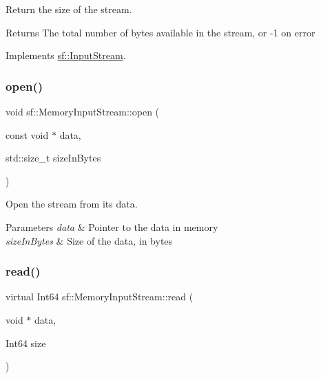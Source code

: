 Return the size of the stream. 

\begin{DoxyReturn}{Returns}
The total number of bytes available in the stream, or -\/1 on error 
\end{DoxyReturn}


Implements \hyperlink{classsf_1_1_input_stream_a311eaaaa65d636728e5153b574b72d5d}{sf\+::\+Input\+Stream}.

\mbox{\label{classsf_1_1_memory_input_stream_ad3cfb4f4f915f7803d6a0784e394ac19}} 
\subsubsection{\texorpdfstring{open()}{open()}}
{\footnotesize\ttfamily void sf\+::\+Memory\+Input\+Stream\+::open (\begin{DoxyParamCaption}\item[{const void $\ast$}]{data,  }\item[{std\+::size\+\_\+t}]{size\+In\+Bytes }\end{DoxyParamCaption})}



Open the stream from its data. 


\begin{DoxyParams}{Parameters}
{\em data} & Pointer to the data in memory \\
\hline
{\em size\+In\+Bytes} & Size of the data, in bytes \\
\hline
\end{DoxyParams}
\mbox{\label{classsf_1_1_memory_input_stream_adff5270c521819639154d42d76fd4c34}} 
\subsubsection{\texorpdfstring{read()}{read()}}
{\footnotesize\ttfamily virtual Int64 sf\+::\+Memory\+Input\+Stream\+::read (\begin{DoxyParamCaption}\item[{void $\ast$}]{data,  }\item[{Int64}]{size }\end{DoxyParamCaption})\hspace{0.3cm}{\ttfamily [virtual]}}



